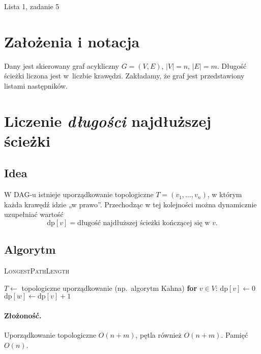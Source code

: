 \documentclass[11pt,a4paper]{article}
\begin{document}
\begin{center}
\Large Lista 1, zadanie 5\\

\end{center}

\bigskip
\section*{Założenia i notacja}

Dany jest skierowany graf acykliczny
\(G=(V,E)\), \(|V|=n\), \(|E|=m\).
Długość ścieżki liczona jest w~liczbie krawędzi.
Zakładamy, że graf jest przedstawiony listami
następników.

\section{Liczenie \emph{długości} najdłuższej ścieżki}

\subsection*{Idea}
W DAG-u istnieje uporządkowanie topologiczne
\(T=(v_1,\dots,v_n)\), w którym każda krawędź
idzie „w prawo”.
Przechodząc w tej kolejności
można dynamicznie uzupełniać wartość
\[
\text{dp}[v]=\text{długość najdłuższej ścieżki
            kończącej się w }v .
\]

\subsection*{Algorytm}

\begin{algorithm}[H]
\caption{\textsc{LongestPathLength}}
\begin{algorithmic}[1]
\State $T\gets$ topologiczne uporządkowanie
       (np.\ algorytm Kahna)
\State \textbf{for} $v\in V$: $\text{dp}[v]\gets 0$
               
         \State $\text{dp}[w]\gets\text{dp}[v]+1$
      \EndIf
   \EndFor
\EndFor
\State {}
\end{algorithmic}
\end{algorithm}

\paragraph{Złożoność.}
Uporządkowanie topologiczne $O(n+m)$,
pętla również $O(n+m)$.
Pamięć $O(n)$.
\end{document}

